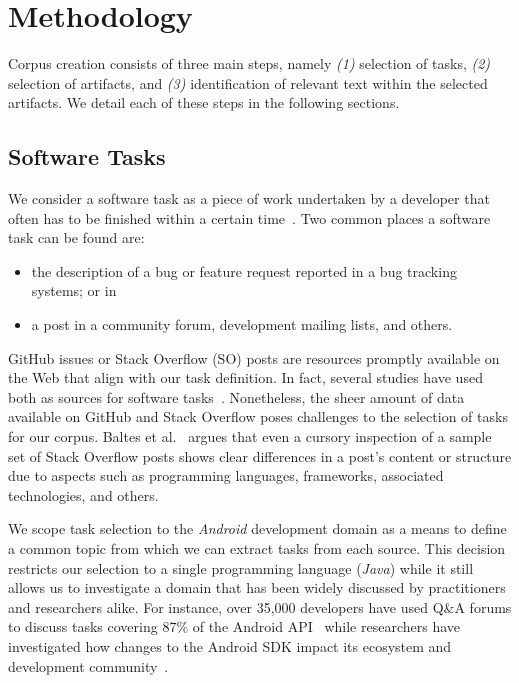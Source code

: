 \section{Methodology}
\label{cp4:methodology}

Corpus creation consists of three main steps, namely \textit{(1)} selection of tasks, \textit{(2)} selection of artifacts, and \textit{(3)} identification of relevant text within the selected artifacts. We detail each of these steps in the following sections.




\subsection{Software Tasks}
\label{cp4:corpus-tasks}


We consider a software task as a piece of work undertaken by a developer that often has to be finished within a certain time~\cite{2004merriam}.
Two common places a software task can be found are:

\begin{itemize}
    \item the description of a bug or feature request reported in a bug tracking systems; or in
    \item a post in a community forum, development mailing lists, and others.
\end{itemize}

GitHub issues or Stack Overflow (SO) posts are resources promptly available on the Web that align with our task definition.
In fact, several studies have used both as sources for software tasks~\cite{Arya2019, baltes2019, nadi2020, Xu2017}. Nonetheless, the sheer amount of data available on GitHub and Stack Overflow poses challenges to the selection of tasks for our corpus.
Baltes et al.~\cite{baltes2019} argues that even a cursory inspection of a sample set
of Stack Overflow posts shows clear differences in a post's content or structure due to aspects such as programming languages, frameworks, associated technologies, and others.


We scope task selection to
the \textit{Android} development domain as a means to define a common topic from which we can extract tasks from each source. This decision
restricts our selection to a single programming language (\textit{Java})
while it still allows us to investigate a domain that has been
widely discussed by practitioners and researchers alike.
For instance, over 35,000 developers have used Q\&A forums to discuss tasks covering 87\% of the Android API~\cite{parnin2012}
while researchers have investigated how changes to the Android SDK impact its ecosystem and development community~\cite{linares2014, bavota2014b, mcdonnell2013}.


